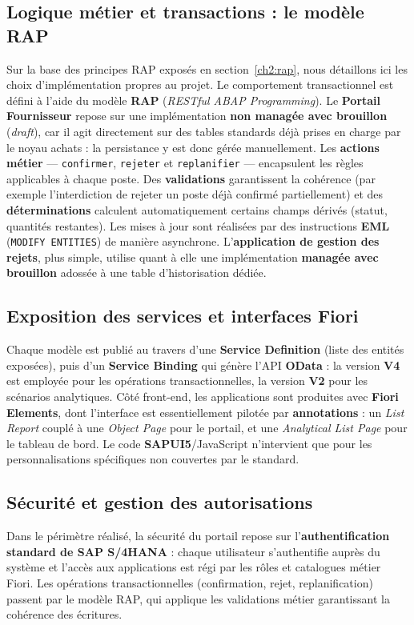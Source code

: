 \documentclass[12pt,a4paper,oneside]{report}
\begin{document}
\subsection{Logique métier et transactions : le modèle RAP}\label{ch5:rap}
Sur la base des principes RAP exposés en section~\ref{ch2:rap}, nous détaillons ici les
choix d'implémentation propres au projet. Le comportement transactionnel est défini à
l'aide du modèle \textbf{RAP} (\textit{RESTful
ABAP Programming}). Le \textbf{Portail Fournisseur} repose sur une implémentation
\textbf{non managée avec brouillon} (\textit{draft}), car il agit directement sur des
tables standards déjà prises en charge par le noyau achats : la persistance y est donc
gérée manuellement. Les \textbf{actions métier} --- \texttt{confirmer}, \texttt{rejeter}
et \texttt{replanifier} --- encapsulent les règles applicables à chaque poste. Des
\textbf{validations} garantissent la cohérence (par exemple l'interdiction de rejeter un
poste déjà confirmé partiellement) et des \textbf{déterminations} calculent
automatiquement certains champs dérivés (statut, quantités restantes). Les mises à jour
sont réalisées par des instructions \textbf{EML} (\texttt{MODIFY ENTITIES}) de manière
asynchrone. L'\textbf{application de gestion des rejets}, plus simple, utilise quant à
elle une implémentation \textbf{managée avec brouillon} adossée à une table d'historisation
dédiée.

\subsection{Exposition des services et interfaces Fiori}\label{ch5:services-fiori}
Chaque modèle est publié au travers d'une \textbf{Service Definition} (liste des entités
exposées), puis d'un \textbf{Service Binding} qui génère l'API \textbf{OData} : la version
\textbf{V4} est employée pour les opérations transactionnelles, la version \textbf{V2}
pour les scénarios analytiques. Côté front-end, les applications sont produites avec
\textbf{Fiori Elements}, dont l'interface est essentiellement pilotée par
\textbf{annotations} : un \textit{List Report} couplé à une \textit{Object Page} pour le
portail, et une \textit{Analytical List Page} pour le tableau de bord. Le code
\textbf{SAPUI5}/JavaScript n'intervient que pour les personnalisations spécifiques non
couvertes par le standard.

\subsection{Sécurité et gestion des autorisations}\label{ch5:securite}
Dans le périmètre réalisé, la sécurité du portail repose sur l'\textbf{authentification
standard de SAP S/4HANA} : chaque utilisateur s'authentifie auprès du système et l'accès
aux applications est régi par les rôles et catalogues métier Fiori. Les opérations
transactionnelles (confirmation, rejet, replanification) passent par le modèle RAP, qui
applique les validations métier garantissant la cohérence des écritures.
\end{document}
